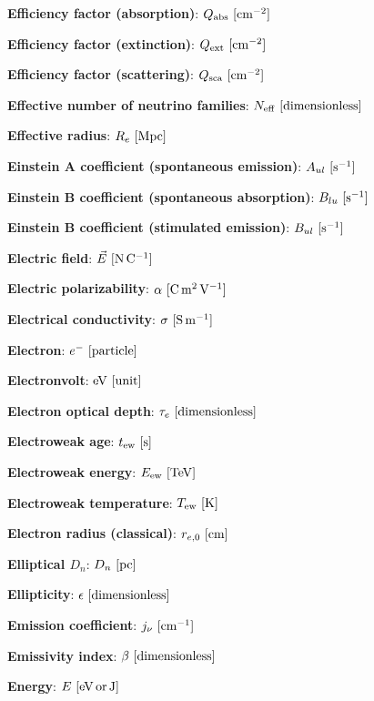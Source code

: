 \documentclass[a4paper,10pt]{article}
\begin{document}
{\noindent}\textbf{Efficiency factor (absorption)}: $Q_{\rm abs} ~ [{\rm cm^{-2}}]$

{\noindent}\textbf{Efficiency factor (extinction)}: $Q_{\rm ext} ~ [{\rm cm^{-2}}]$

{\noindent}\textbf{Efficiency factor (scattering)}: $Q_{\rm sca} ~ [{\rm cm^{-2}}]$

{\noindent}\textbf{Effective number of neutrino families}: $N_\mathrm{eff} ~ [{\rm dimensionless}]$

{\noindent}\textbf{Effective radius}: $R_e ~ [{\rm Mpc}]$

{\noindent}\textbf{Einstein A coefficient (spontaneous emission)}: $A_{ul} ~ [{\rm s^{-1}}]$

{\noindent}\textbf{Einstein B coefficient (spontaneous absorption)}: $B_{lu} ~ [{\rm s^{-1}}]$

{\noindent}\textbf{Einstein B coefficient (stimulated emission)}: $B_{ul} ~ [{\rm s^{-1}}]$

{\noindent}\textbf{Electric field}: $\vec{E} ~ [{\rm N\,C^{-1}}]$

{\noindent}\textbf{Electric polarizability}: $\alpha ~ [{\rm C\,m^2\,V^{-1}}]$

{\noindent}\textbf{Electrical conductivity}: $\sigma ~ [{\rm S\,m^{-1}}]$

{\noindent}\textbf{Electron}: $e^- ~ [{\rm particle}]$

{\noindent}\textbf{Electronvolt}: ${\rm eV} ~ [{\rm unit}]$

{\noindent}\textbf{Electron optical depth}: $\tau_e ~ [{\rm dimensionless}]$

{\noindent}\textbf{Electroweak age}: $t_\mathrm{ew} ~ [{\rm s}]$

{\noindent}\textbf{Electroweak energy}: $E_\mathrm{ew} ~ [{\rm TeV}]$

{\noindent}\textbf{Electroweak temperature}: $T_\mathrm{ew} ~ [{\rm K}]$

{\noindent}\textbf{Electron radius (classical)}: $r_{e,0} ~ [{\rm cm}]$

{\noindent}\textbf{Elliptical $D_n$}: $D_n ~ [{\rm pc}]$

{\noindent}\textbf{Ellipticity}: $\epsilon ~ [{\rm dimensionless}]$

{\noindent}\textbf{Emission coefficient}: $j_\nu ~ [{\rm cm^{-1}}]$

{\noindent}\textbf{Emissivity index}: $\beta ~ [{\rm dimensionless}]$

{\noindent}\textbf{Energy}: $E ~ [{\rm eV\,or\,J}]$
\end{document}
